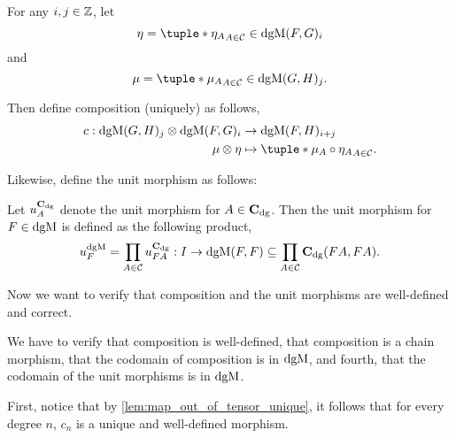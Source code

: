 \begin{remark}
    \label{rem:dgm_composition_and_unit_morphisms}
    For any \( i, j \in {\mathbb{Z}} \), let
    \[
        \eta = \tuple*{\eta_A}_{A \in \Cc} \in \dgM(F, G)_i
    \]
    and
    \[
        \mu = \tuple*{\mu_A}_{A \in \Cc} \in \dgM(G, H)_j.
    \]

    Then define composition (uniquely) as follows,
    \begin{align*}
        c: \dgM(G, H)_j \otimes \dgM(F, G)_i &\to \dgM(F, H)_{i + j} \\
        \mu \otimes \eta &\mapsto \tuple*{\mu_A \circ \eta_A}_{A \in \Cc}.
    \end{align*}

    Likewise, define the unit morphism as follows:
    
    Let \( u_A^{\operatorname{\mathbf{C}}_{\operatorname{dg}}} \) denote the unit morphism for \( A \in \operatorname{\mathbf{C}}_{\operatorname{dg}} \). Then the unit morphism for \( F \in \operatorname{dgM} \) is defined as the following product,
    \[
        u_F^{\operatorname{dgM}} = \prod_{A \in {\mathcal{C}}} u_{F A}^{\operatorname{\mathbf{C}}_{\operatorname{dg}}} : I \to \operatorname{dgM}(F, F) \subseteq \prod_{A \in {\mathcal{C}}} \operatorname{\mathbf{C}}_{\operatorname{dg}}(F A, F A).
    \]

    Now we want to verify that composition and the unit morphisms are well-defined and correct.

    We have to verify that composition is well-defined, that composition is a chain morphism, that the codomain of composition is in \( \operatorname{dgM} \), and fourth, that the codomain of the unit morphisms is in \( \operatorname{dgM} \).

    First, notice that by \autoref{lem:map_out_of_tensor_unique}, it follows that for every degree \( n \), \( c_n \) is a unique and well-defined morphism.


\end{remark}
